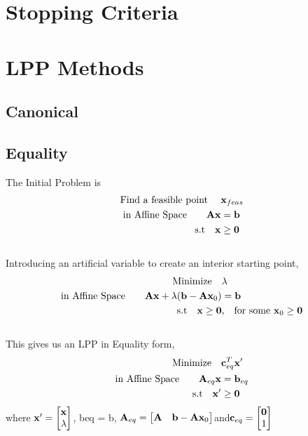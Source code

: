 \documentclass{report}
\begin{document}
\section{Stopping Criteria}


\section{LPP Methods}

	\subsection{Canonical}

\CanLP
\vspace{1cm}

\pagebreak

\subsection{Equality}

The Initial Problem is
\begin{align*}
	\text{Find a feasible point \quad}&  \mathbf x_{feas}\\
	\text{in Affine Space\quad } \quad \mathbf A\mathbf x &= \mathbf b\\
	\text{s.t\quad } 	 \mathbf x &\ge \mathbf 0
\end{align*}
\\
Introducing an artificial variable to create an interior starting point,
\begin{align*}
	\text{Minimize\quad  }&  \lambda\\
	\text{in Affine Space\quad } \quad\mathbf A\mathbf x  + \lambda (\mathbf b - \mathbf A\mathbf x_{0})&= \mathbf b\\
	\text{s.t\quad } 	 \mathbf x \ge \mathbf 0&\text{,\quad  for some } \mathbf x_{0} \ge \mathbf 0
\end{align*}
\\
This gives us an  LPP in Equality form,
\begin{align*}
	\text{Minimize\quad  }&  \mathbf c_{eq}^T \mathbf x'\\
	\text{in Affine Space\quad } \quad\mathbf A_{eq}\mathbf x  &= \mathbf b_{eq}\\
	\text{s.t\quad } 	 \mathbf x' &\ge \mathbf 0
\end{align*}
\quad where $\mathbf x' =  \begin{bmatrix}\mathbf x \\ \lambda\end{bmatrix}$, \vei b{eq} = \ve b, $\mathbf A_{eq} =  \begin{bmatrix}\mathbf A & \mathbf b - \mathbf A\mathbf x_{0}\end{bmatrix}$\quad  and\quad  $\mathbf c_{eq} =  \begin{bmatrix}\mathbf 0\\ 1\end{bmatrix}$
\\[1em]
\end{document}

